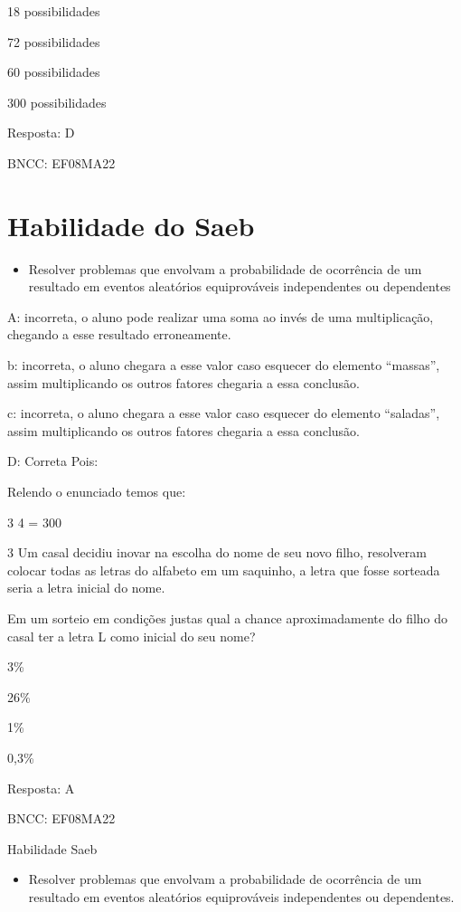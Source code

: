 \item 18 possibilidades
\item 72 possibilidades
\item 60 possibilidades
\item 300 possibilidades

Resposta: D

BNCC: EF08MA22

\section{Habilidade do Saeb}

\begin{itemize}
\tightlist

\item 
  Resolver problemas que envolvam a probabilidade de ocorrência de um
  resultado em eventos aleatórios equiprováveis independentes ou
  dependentes
\end{itemize}

A: incorreta, o aluno pode realizar uma soma ao invés de uma
multiplicação, chegando a esse resultado erroneamente.

b: incorreta, o aluno chegara a esse valor caso esquecer do elemento
``massas'', assim multiplicando os outros fatores chegaria a essa
conclusão.

c: incorreta, o aluno chegara a esse valor caso esquecer do elemento
``saladas'', assim multiplicando os outros fatores chegaria a essa
conclusão.

D: Correta Pois:

Relendo o enunciado temos que:

\num{3} 4 = 300

\num{3} Um casal decidiu inovar na escolha do nome de seu novo filho,
resolveram colocar todas as letras do alfabeto em um saquinho, a letra
que fosse sorteada seria a letra inicial do nome.

Em um sorteio em condições justas qual a chance aproximadamente do filho
do casal ter a letra L como inicial do seu nome?

\item 3\%
\item 26\%
\item 1\%
\item 0,3\%

Resposta: A

BNCC: EF08MA22

Habilidade Saeb

\begin{itemize}
\tightlist

\item 
  Resolver problemas que envolvam a probabilidade de ocorrência de um
  resultado em eventos aleatórios equiprováveis independentes ou
  dependentes.
\end{itemize}

